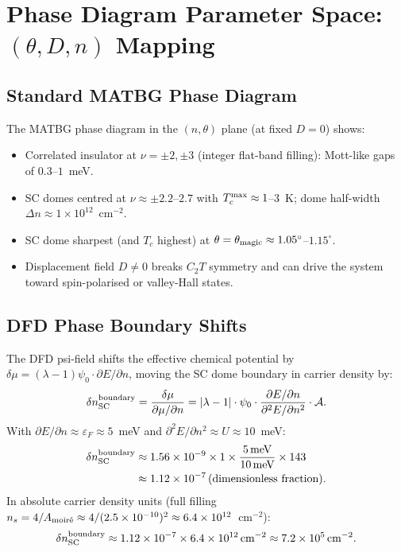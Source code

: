 \documentclass[11pt]{article}
\newcommand{\ee}[1]{\times 10^{#1}}
\newcommand{\tmagic}{\theta_{\rm magic}}
\newcommand{\nuFill}{\nu}
\newcommand{\lambdabound}{1.56\ee{-9}}
\begin{document}
\section{Phase Diagram Parameter Space: $(\theta, D, n)$ Mapping}
\label{sec:phase_diagram}

\subsection{Standard MATBG Phase Diagram}

The MATBG phase diagram in the $(n, \theta)$ plane (at fixed $D = 0$) shows:
\begin{itemize}
  \item Correlated insulator at $\nuFill = \pm 2, \pm 3$ (integer flat-band
    filling): Mott-like gaps of $0.3$--$1$~meV.
  \item SC domes centred at $\nuFill \approx \pm 2.2$--$2.7$ with
    $T_c^{\rm max} \approx 1$--$3$~K; dome half-width $\Delta n \approx
    1\ee{12}$~cm$^{-2}$.
  \item SC dome sharpest (and $T_c$ highest) at $\theta = \tmagic
    \approx 1.05^\circ$--$1.15^\circ$.
  \item Displacement field $D \ne 0$ breaks $C_2T$ symmetry and can
    drive the system toward spin-polarised or valley-Hall states.
\end{itemize}

\subsection{DFD Phase Boundary Shifts}

The DFD psi-field shifts the effective chemical potential by
$\delta\mu = (\lambda-1)\psi_0 \cdot \partial E/\partial n$, moving
the SC dome boundary in carrier density by:
\begin{equation}
  \delta n_{\rm SC}^{\rm boundary} = \frac{\delta\mu}{\partial\mu/\partial n}
    = |\lambda-1| \cdot \psi_0 \cdot \frac{\partial E/\partial n}
      {\partial^2 E/\partial n^2} \cdot \mathcal{A}.
  \label{eq:dn_boundary}
\end{equation}
With $\partial E/\partial n \approx \varepsilon_F \approx 5$~meV and
$\partial^2 E/\partial n^2 \approx U \approx 10$~meV:
\begin{align}
  \delta n_{\rm SC}^{\rm boundary}
    &\approx \lambdabound \times 1 \times \frac{5\,\text{meV}}
      {10\,\text{meV}} \times 143 \nonumber\\
    &\approx 1.12\ee{-7}\,\text{(dimensionless fraction)}.
  \label{eq:dn_value}
\end{align}
In absolute carrier density units
(full filling $n_s = 4/A_{\rm moir\acute{e}} \approx 4/(2.5\ee{-10})^2
\approx 6.4\ee{12}$~cm$^{-2}$):
\begin{equation}
  \delta n_{\rm SC}^{\rm boundary}
    \approx 1.12\ee{-7} \times 6.4\ee{12}\,\text{cm}^{-2}
    \approx 7.2\ee{5}\,\text{cm}^{-2}.
  \label{eq:dn_abs}
\end{equation}
\end{document}
